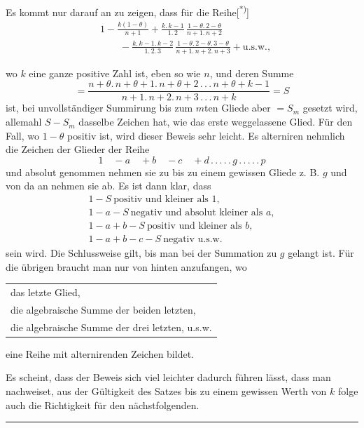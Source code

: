 \clearpage{}
\noindent\hspace*{\parindent}Es kommt nur darauf an zu zeigen, dass für die Reihe[\textsuperscript{*)}]
\[
\begin{aligned}
&1-\frac{k(1-\theta)}{n+1}+\frac{k{.}\,k-1}{1{.}\,2}\,\frac{1-\theta{.}\,2-\theta}{n+1{.}\,n+2}\\[.7em]
&\qquad-\frac{k{.}\,k-1{.}\,k-2}{1{.}\,2{.}\,3}\,\frac{1-\theta{.}\,2-\theta{.}\,3-\theta}{n+1{.}\,n+2{.}\,n+3}+\text{u.s.w.},
\end{aligned}
\]
\noindent{\small[S. 292]}\par
\noindent wo $k$ eine ganze positive Zahl ist, eben so wie $n$, und deren Summe
\[
=\frac{n+\theta{.}\,n+\theta+1{.}\,n+\theta+2\,{.}\,{.}\,{.}\,n+\theta+k-1}{n+1{.}\,n+2{.}\,n+3\,{.}\,{.}\,{.}\,n+k}=S
\]
\noindent ist, bei unvollständiger Summirung bis zum $m$ten Gliede aber $=S_m$ gesetzt wird, allemahl $S-S_m$ dasselbe Zeichen hat, wie das erste weggelassene Glied. Für den Fall, wo $1-\theta$ positiv ist, wird dieser Beweis sehr leicht. Es alterniren nehmlich die Zeichen der Glieder der Reihe
\[
1\quad-a\quad+b\quad-c\quad+d\,{.}\,{.}\,{.}\,{.}\,{.}\,g\,{.}\,{.}\,{.}\,{.}\,{.}\,p
\]
\noindent und absolut genommen nehmen sie zu bis zu einem gewissen Gliede z. B. $g$ und von da an nehmen sie ab. Es ist dann klar, dass
\[
\begin{array}{l}
1-S\ \text{positiv und kleiner als }1,\\[.3em]
1-a-S\ \text{negativ und absolut kleiner als }a,\\[.3em]
1-a+b-S\ \text{positiv und kleiner als }b,\\[.3em]
1-a+b-c-S\ \text{negativ u.s.w.}
\end{array}
\]
\noindent sein wird. Die Schlussweise gilt, bis man bei der Summation zu $g$ gelangt ist. Für die übrigen braucht man nur von hinten anzufangen, wo
\begin{center}
\begin{tabular}{l}
das letzte Glied,\\
die algebraische Summe der beiden letzten,\\
die algebraische Summe der drei letzten, u.s.w.
\end{tabular}
\end{center}
\noindent eine Reihe mit alternirenden Zeichen bildet.
\par\smallskip\noindent{\small[S. 293]}\par
\noindent\hspace*{\parindent}Es scheint, dass der Beweis sich viel leichter dadurch führen lässt, dass man nachweiset, aus der Gültigkeit des Satzes bis zu einem gewissen Werth von $k$ folge auch die Richtigkeit für den nächstfolgenden.
\par\medskip\noindent\rule{.25\linewidth}{.4pt}\par\smallskip
{\small{}\par}
\clearpage
